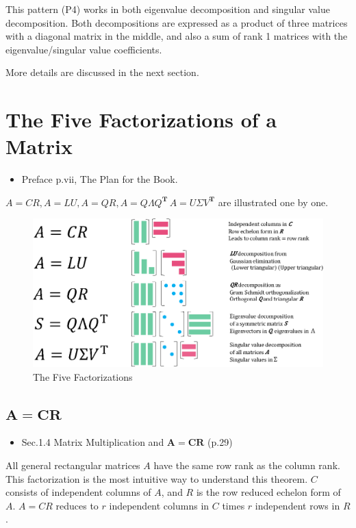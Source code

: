 \documentclass[letterpaper]{article}
\begin{document}
This pattern (P4) works in both eigenvalue decomposition and singular value decomposition.
Both decompositions are expressed as a product of three matrices with a diagonal matrix in the middle,
and also a sum of rank 1 matrices with the eigenvalue/singular value coefficients.

More details are discussed in the next section.

\clearpage

\section{The Five Factorizations of a Matrix}

\begin{itemize}
  \item Preface p.vii, The Plan for the Book.
\end{itemize}
$A=CR, A=LU, A=QR, A=Q \Lambda Q^\mathbf{T}\, A=U \Sigma V^\mathbf{T}$ are 
illustrated one by one.

\begin{figure}[H]
  \includegraphics[keepaspectratio, width=\linewidth]{5-Factorizations.eps}
  \caption{The Five Factorizations}
\end{figure}

\clearpage

\subsection{$\boldsymbol{A=CR}$}

\begin{itemize}
  \item Sec.1.4 Matrix Multiplication and $\bm{A=CR}$ (p.29)
\end{itemize}

All general rectangular matrices $A$ have the same row rank as the column rank.
This factorization is the most intuitive way to understand this theorem.
$C$ consists of independent columns of $A$, and $R$ is the row reduced echelon form of $A$.
$A=CR$ reduces to $r$ independent columns in $C$ times $r$ independent rows in $R$.
\end{document}

